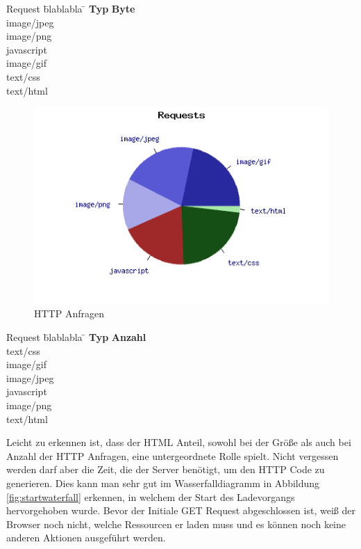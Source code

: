 \begin{tabbing}
Request \quad\= blablabla \quad\= \kill
\textbf{Typ} 	 \> \textbf{Byte} \\
image/jpeg	\\
image/png	\\
javascript	\\
image/gif	\\
text/css	\\
text/html	\\
\end{tabbing}

\begin{figure}[!ht]
  \centering
  \includegraphics[scale=0.5]{material/start_request_pie.png}
  \caption{HTTP Anfragen}
  \label{fig:startrequest}
\end{figure}
\begin{tabbing}
Request \quad\= blablabla \quad\= \kill
\textbf{Typ} 	 \> \textbf{Anzahl} \\
text/css	  	\\
image/gif	  	\\
image/jpeg	  	\\
javascript	  	\\ 
image/png	  	\\
text/html	  	\\
\end{tabbing}
Leicht zu erkennen ist, dass der HTML Anteil, sowohl bei der Größe als auch bei Anzahl der HTTP Anfragen, eine untergeordnete Rolle spielt. Nicht vergessen werden darf aber die Zeit, die der Server benötigt, um den HTTP Code zu generieren. Dies kann man sehr gut im Wasserfalldiagramm in Abbildung \ref{fig:startwaterfall} erkennen, in welchem der Start des Ladevorgangs hervorgehoben wurde. Bevor der Initiale GET Request abgeschlossen ist, weiß der Browser noch nicht, welche Ressourcen er laden muss und es können noch keine anderen Aktionen ausgeführt werden.
